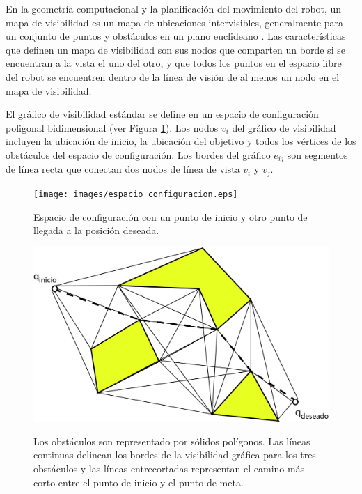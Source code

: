
En la geometría computacional y la planificación del movimiento del 
robot, un mapa de visibilidad es un mapa de ubicaciones intervisibles, 
generalmente para un conjunto de puntos y obstáculos en un plano 
euclideano \cite{wikiVisibilityGraph}. Las características que definen 
un mapa de visibilidad son sus nodos que comparten un borde si se encuentran 
a la vista el uno del otro, y que todos los puntos en el espacio libre del 
robot se encuentren dentro de la línea de visión de al menos un nodo 
en el mapa de visibilidad. 

El gráfico de visibilidad estándar se define en un espacio de 
configuración poligonal bidimensional (ver Figura \ref{f:mapPolygonal}). Los 
nodos $v_{i}$ del gráfico de visibilidad incluyen la ubicación de 
inicio, la ubicación del objetivo y todos los vértices de los obstáculos 
del espacio de configuración. Los bordes del gráfico $e_{ij}$ son 
segmentos de línea recta que conectan dos nodos de línea de vista $v_{i}$ 
y $v_{j}$.

\begin{figure}%
\centering \footnotesize
 {\texttt{[image: images/espacio\_configuracion.eps]}}
 \captionsetup{font=footnotesize}
 \caption{Espacio de configuración con un punto de inicio y otro punto 
 de llegada a la posición deseada.}
\label{f:mapPolygonal}
\end{figure}

\begin{figure}%
\centering \footnotesize
 {\includegraphics[width=0.70\linewidth]{images/espacio_configuracion2.jpg}}
 \captionsetup{font=footnotesize}
 \caption{Los obstáculos son representado por sólidos polígonos. Las 
 líneas continuas delinean los bordes de la visibilidad gráfica para 
 los tres obstáculos y las líneas entrecortadas representan el camino 
 más corto entre el punto de inicio y el punto de meta.}
\label{f:shortVG}
\end{figure}

